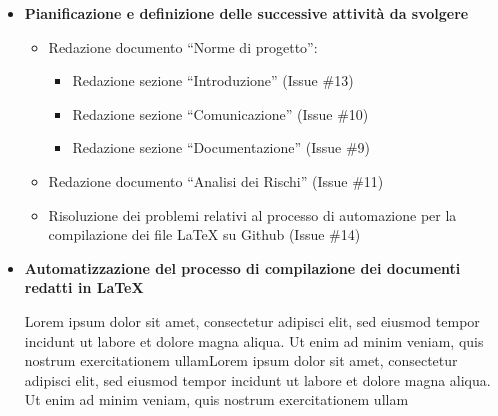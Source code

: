 \documentclass{article}
\begin{document}
\begin{itemize}
  \item \textbf{\fontsize{12}{6}\selectfont Pianificazione e definizione delle successive attività da svolgere}
  \begin{itemize}
    \item Redazione documento “Norme di progetto”:
    \begin{itemize}
      \item Redazione sezione “Introduzione” (Issue \#13)
      \item Redazione sezione “Comunicazione” (Issue \#10)
      \item Redazione sezione “Documentazione” (Issue \#9)
    \end{itemize}
    \item Redazione documento “Analisi dei Rischi” (Issue \#11)
    \item Risoluzione dei problemi relativi al processo di automazione per la compilazione dei file LaTeX su Github  (Issue \#14)
  \end{itemize}
  \vspace{0.5cm}
  
  \item \textbf{\fontsize{12}{6}\selectfont Automatizzazione del processo di compilazione dei documenti redatti in LaTeX}
  
  Lorem ipsum dolor sit amet, consectetur adipisci elit, sed eiusmod tempor incidunt ut labore et dolore magna aliqua. Ut enim ad minim veniam, quis nostrum exercitationem ullamLorem ipsum dolor sit amet, consectetur adipisci elit, sed eiusmod tempor incidunt ut labore et dolore magna aliqua. Ut enim ad minim veniam, quis nostrum exercitationem ullam  \vspace{0.5cm}
  \end{itemize}
\end{document}
